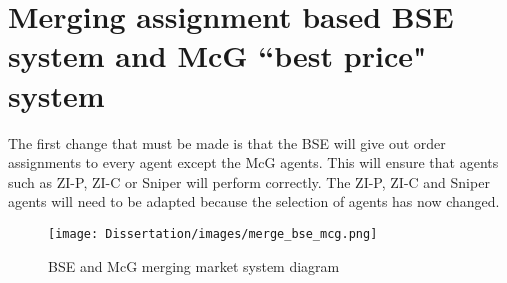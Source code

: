 \section{Merging assignment based BSE system and McG ``best price" system}
The first change that must be made is that the BSE will give out order assignments to every agent except the McG agents. This will ensure that agents such as ZI-P, ZI-C or Sniper will perform correctly. The ZI-P, ZI-C and Sniper agents will need to be adapted because the selection of agents has now changed. 

\begin{figure}[!htbp]
\texttt{[image: Dissertation/images/merge\_bse\_mcg.png]}
\caption{BSE and McG merging market system diagram} 
\end{figure} 
\FloatBarrier

%  